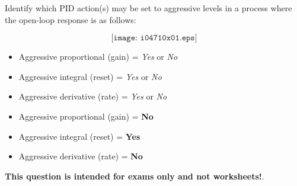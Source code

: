 

Identify which PID action(s) may be set to aggressive levels in a process where the open-loop response is as follows:

$$\texttt{[image: i04710x01.eps]}$$

\begin{itemize}
\item{} Aggressive proportional (gain) = {\it Yes} or {\it No}
\vskip 10pt
\item{} Aggressive integral (reset) = {\it Yes} or {\it No} 
\vskip 10pt
\item{} Aggressive derivative (rate) = {\it Yes} or {\it No} 
\end{itemize}







\begin{itemize}
\item{} Aggressive proportional (gain) = {\bf No}
\vskip 10pt
\item{} Aggressive integral (reset) = {\bf Yes} 
\vskip 10pt
\item{} Aggressive derivative (rate) = {\bf No} 
\end{itemize}







{\bf This question is intended for exams only and not worksheets!}.



